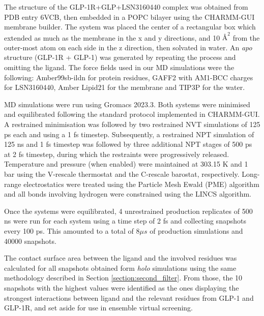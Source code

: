 \documentclass[letterpaper]{article}
\begin{document}
The structure of the GLP-1R+GLP+LSN3160440 complex was obtained from PDB entry 6VCB\cite{Bueno2020StructuralReceptor}, then embedded in a POPC bilayer using the CHARMM-GUI membrane builder\cite{Lee2016CHARMM-GUIField,Feng2023CHARMM-GUIApplications}. The system was placed the center of a rectangular box which extended as much as the membrane in the x and y directions, and 10 $\text{\AA}^{2}$ from the outer-most atom on each side in the z direction, then solvated in water. An \textit{apo} structure (GLP-1R + GLP-1) was generated by repeating the process and omitting the ligand. The force fields used in our MD simulations were the following: Amber99sb-ildn\cite{Lindorff-Larsen2010ImprovedField} for protein residues, GAFF2\cite{Wang2004DevelopmentField,TheFields} with AM1-BCC charges\cite{Jakalian2002FastValidation} for LSN3160440, Amber Lipid21\cite{Dickson2022Lipid21:AMBER} for the membrane and TIP3P\cite{Mark2001StructureK} for the water.

MD simulations were run using Gromacs 2023.3\cite{Abraham2015GROMACS:Supercomputers}. Both systems were minimised and equilibrated following the standard protocol implemented in CHARMM-GUI. A restrained minimisation was followed by two restrained NVT simulations of 125 ps each and using a 1 fs timestep. Subsequently, a restrained NPT simulation of 125 ns and 1 fs timestep was followed by three additional NPT stages of 500 ps at 2 fs timestep, during which the restraints were progressively released. Temperature and pressure (when enabled) were maintained at 303.15 K and 1 bar using the V-rescale thermostat\cite{Bussi2007CanonicalRescaling} and the C-rescale barostat\cite{Bernetti2020PressureRescaling}, respectively. Long-range electrostatics were treated using the Particle Mesh Ewald (PME) algorithm\cite{Darden1993ParticleSystems} and all bonds involving hydrogen were constrained using the LINCS algorithm\cite{Hess1998LINCS:Simulations}.

Once the systems were equilibrated, 4 unrestrained production replicates of 500 ns were run for each system using a time step of 2 fs and collecting snapshots every 100 ps. This amounted to a total of 8$\mu s$ of production simulations and 40000 snapshots.

The contact surface area between the ligand and the involved residues was calculated for all snapshots obtained form \textit{holo} simulations using the same methodology described in Section \ref{section:second_filter}. From those, the 10 snapshots with the highest values were identified as the ones displaying the strongest interactions between ligand and the relevant residues from GLP-1 and GLP-1R, and set aside for use in ensemble virtual screening.
\end{document}
